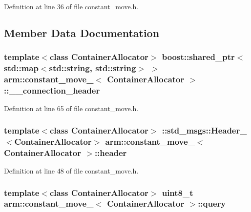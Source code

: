 \-Definition at line 36 of file constant\-\_\-move.\-h.



\subsection{\-Member \-Data \-Documentation}
\subsubsection[{\-\_\-\-\_\-connection\-\_\-header}]{\setlength{\rightskip}{0pt plus 5cm}template$<$class \-Container\-Allocator$>$ boost\-::shared\-\_\-ptr$<$std\-::map$<$std\-::string, std\-::string$>$ $>$ {\bf arm\-::constant\-\_\-move\-\_\-}$<$ \-Container\-Allocator $>$\-::{\bf \-\_\-\-\_\-connection\-\_\-header}}\label{structarm_1_1constant__move___a93bb4e25d33d5546ac09f13703f8ca72}


\-Definition at line 65 of file constant\-\_\-move.\-h.

\subsubsection[{header}]{\setlength{\rightskip}{0pt plus 5cm}template$<$class \-Container\-Allocator$>$ \-::std\-\_\-msgs\-::\-Header\-\_\-$<$\-Container\-Allocator$>$ {\bf arm\-::constant\-\_\-move\-\_\-}$<$ \-Container\-Allocator $>$\-::{\bf header}}\label{structarm_1_1constant__move___a04ceb42ae09a2d865c88cfa9c8ec1d8e}


\-Definition at line 48 of file constant\-\_\-move.\-h.

\subsubsection[{query}]{\setlength{\rightskip}{0pt plus 5cm}template$<$class \-Container\-Allocator$>$ uint8\-\_\-t {\bf arm\-::constant\-\_\-move\-\_\-}$<$ \-Container\-Allocator $>$\-::{\bf query}}\label{structarm_1_1constant__move___ac9432d9b4e6465298dad5c8decf9ce5e}



